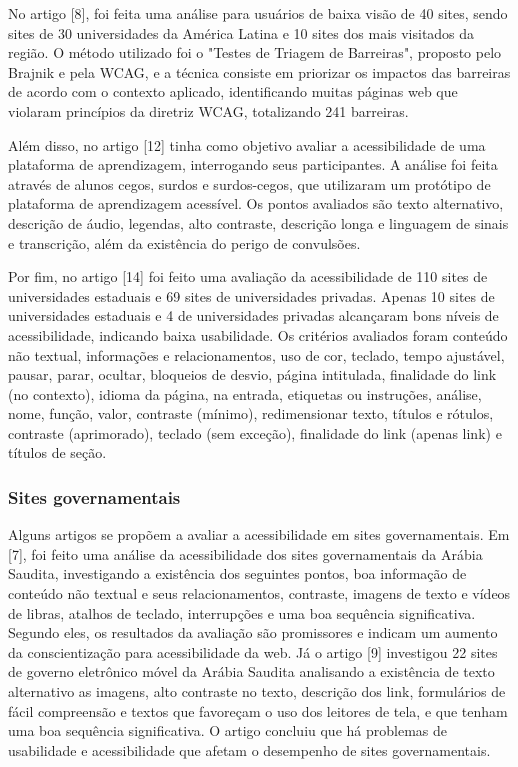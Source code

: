 \documentclass[a4paper]{article}
\begin{document}
\begin{titlepage}
No artigo [8], foi feita uma análise para usuários de baixa visão de 40 sites, sendo sites de 30 universidades da América Latina e 10 sites dos mais visitados da região. O método utilizado foi o "Testes de Triagem de Barreiras", proposto pelo Brajnik e pela WCAG, e a técnica consiste em priorizar os impactos das barreiras de acordo com o contexto aplicado, identificando muitas páginas web que violaram princípios da diretriz WCAG, totalizando 241 barreiras.

Além disso, no artigo [12] tinha como objetivo avaliar a acessibilidade de uma plataforma de aprendizagem, interrogando seus participantes. A análise foi feita através de alunos cegos, surdos e surdos-cegos, que utilizaram um protótipo de plataforma de aprendizagem acessível. Os pontos avaliados são texto alternativo, descrição de áudio, legendas, alto contraste, descrição longa e linguagem de sinais e transcrição, além da existência do perigo de convulsões. 

Por fim, no artigo [14] foi feito uma avaliação da acessibilidade de 110 sites de universidades estaduais e 69 sites de universidades privadas. Apenas 10 sites de universidades estaduais e 4 de universidades privadas alcançaram bons níveis de acessibilidade, indicando baixa usabilidade. Os critérios avaliados foram conteúdo não textual, informações e relacionamentos, uso de cor, teclado, tempo ajustável, pausar, parar, ocultar, bloqueios de desvio, página intitulada, finalidade do link (no contexto), idioma da página, na entrada, etiquetas ou instruções, análise, nome, função, valor, contraste (mínimo), redimensionar texto, títulos e rótulos, contraste (aprimorado), teclado (sem exceção), finalidade do link (apenas link) e títulos de seção.

\subsubsection{Sites governamentais}

Alguns artigos se propõem a avaliar a acessibilidade em sites governamentais. Em [7], foi feito uma análise da acessibilidade dos sites governamentais da Arábia Saudita, investigando a existência dos seguintes pontos, boa informação de conteúdo não textual e seus relacionamentos, contraste, imagens de texto e vídeos de libras, atalhos de teclado, interrupções e uma boa sequência significativa. Segundo eles, os resultados da avaliação são promissores e indicam um aumento da conscientização para acessibilidade da web. Já o artigo [9] investigou 22 sites de governo eletrônico móvel da Arábia Saudita analisando a existência de texto alternativo as imagens, alto contraste no texto, descrição dos link, formulários de fácil compreensão e textos que favoreçam o uso dos leitores de tela, e que tenham uma boa sequência significativa. O artigo concluiu que há problemas de usabilidade e acessibilidade que afetam o desempenho de sites governamentais.


\end{titlepage}
\end{document}
